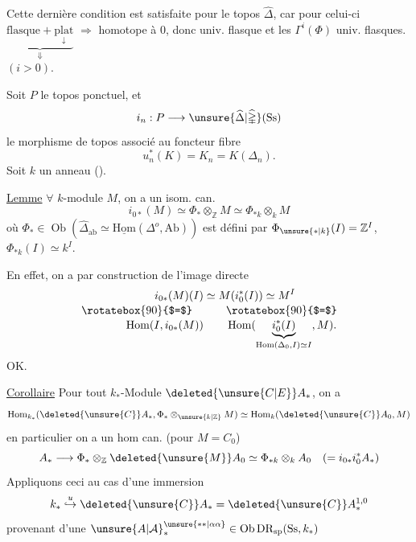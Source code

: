 Cette dernière condition est satisfaite pour le topos  $\widehat\Delta$, car pour celui-ci
$\underbrace{\text{flasque}+\underset{\downarrow}{\text{plat}}}_{\Downarrow}$  $\Longrightarrow$ homotope à $0$, donc univ. flasque et les $\Gamma^i(\Phi)$ univ. flasques. $(i>0)$.

Soit $P$ le topos ponctuel, et
\[
 i_n:P\longrightarrow\unsure{\widehat\Delta|\widehat{\mathbb\Delta}}(\mathrm{Ss})
\]
le morphisme de topos associé au foncteur fibre
\[
 u_n^*(K)=K_n=K(\Delta_n).
\]
Soit $k$ un anneau ().

\uline{Lemme} $\forall$ $k$-module $M$, on a un isom. can.
\[
 i_{0*}(M)\simeq\Phi_*\otimes_{\mathbb Z}M\simeq\Phi_{*k}\otimes_k M
\]
où $\Phi_*\in\operatorname{Ob}(\widehat\Delta_{\mathrm{ab}}\simeq\underline{\mathrm{Hom}}(\Delta^o,\mathrm{Ab}))$ est défini par $\Phi_{\unsure{*|k}}(I)=\mathbb Z^I$,  $\Phi_{*k}(I)\simeq k^I$.

En effet, on a par construction de l'image directe
\[
\begin{aligned}
i_{0*}(M)(I)&\simeq M(i_0^*(I))\simeq M^I\\[-2pt]
\rotatebox{90}{$=$}\quad&\qquad\rotatebox{90}{$=$}\\[-2pt]
\operatorname{Hom}(I,i_{0*}(M))&\qquad\operatorname{Hom}(\underbrace{i_0^*(I)}_{\operatorname{Hom}(\Delta_0,I)\simeq I},M).
\end{aligned}
\]
OK.


\uline{Corollaire} Pour tout $k_*$-Module $\deleted{\unsure{C|E}}A_*$, on a
\[
 \operatorname{Hom}_{k_*}(\deleted{\unsure{C}}A_*,\Phi_*\otimes_{\unsure{k|\mathbb Z}}M)\simeq\operatorname{Hom}_k(\deleted{\unsure{C}}A_0,M)
\]
en particulier on a un hom can. (pour $M=C_0$)
\[
 A_*\longrightarrow\Phi_*\otimes_{\mathbb Z}\deleted{\unsure{M}}A_0\simeq\Phi_{*k}\otimes_k A_0\quad(=i_{0*}i_0^*A_*)
\]
 Appliquons ceci au cas d'une immersion
\[
 k_*\overset{u}{\hookrightarrow}\deleted{\unsure{C}}A_*=\deleted{\unsure{C}}A_*^{1,0}
\]
provenant d'une $\unsure{A|\mathcal A}_*^{\unsure{**|\alpha\alpha}}\in\operatorname{Ob}\mathrm{DR}_{\mathrm{sp}}(\mathrm{Ss},k_*)$
